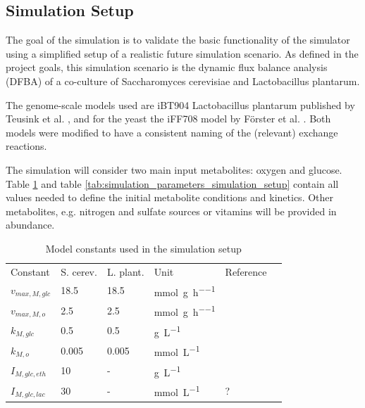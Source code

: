 \subsection{Simulation Setup}\label{ssec:simulation_setup}

The goal of the simulation is to validate the basic functionality of the simulator using a simplified setup of a realistic future
simulation scenario. As defined in the project goals, this simulation scenario is the dynamic flux balance analysis (DFBA) of a
co-culture of Saccharomyces cerevisiae and Lactobacillus plantarum.

The genome-scale models used are iBT904 Lactobacillus plantarum published by Teusink et al. \cite{teusink_analysis_2006},
and for the yeast the iFF708 model by Förster et al. \cite{Foerster01022003}.
Both models were modified to have a consistent naming of the (relevant) exchange reactions.

The simulation will consider two main input metabolites: oxygen and glucose. Table \ref{tab:model_constants_simulation_setup} and table
\ref{tab:simulation_parameters_simulation_setup} contain all values needed to define the initial metabolite conditions and kinetics.
Other metabolites, e.g. nitrogen and sulfate sources or vitamins will be provided in abundance.

\begin{table}[h]
\centering
\caption{Model constants used in the simulation setup}
\label{tab:model_constants_simulation_setup}
\begin{tabular}{llllll}
\rowcolor[HTML]{EFEFEF} 
\cellcolor[HTML]{EFEFEF}Constant & \cellcolor[HTML]{EFEFEF}S. cerev. & \cellcolor[HTML]{EFEFEF}L. plant. & Unit & Reference\\
$v_{max,M,glc}$          &  18.5 &  18.5 & \si{\milli\mole\per\gram\per\hour} & \cite[Table 1]{hanly_dynamic_2013} \\
$v_{max,M,o}$            &   2.5 &   2.5 & \si{\milli\mole\per\gram\per\hour} & \cite[Table 1]{hanly_dynamic_2013} \\
$k_{M,glc}$              &   0.5 &   0.5 & \si{\gram\per\liter} & \cite[Table 1]{hanly_dynamic_2013}  \\
$k_{M,o}$                & 0.005 & 0.005 & \si{\milli\mole\per\liter} & \cite[Table 1]{hanly_dynamic_2013}  \\
$I_{M,glc,eth}$          & 10 & - & \si{\gram\per\liter} & \cite[Table 1]{hjersted_genome-scale_2007} \\
$I_{M,glc,lac}$          & 30 & -  & \si{\milli\mole\per\liter} & ? \\
\end{tabular}
\end{table}

